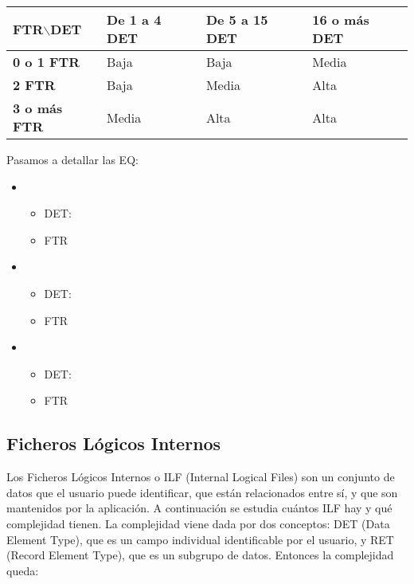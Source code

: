 \documentclass[spanish,a4paper,12pt]{report}	%
\begin{document}
\vspace{0.35cm}

			\begin{tabular}{|p{3cm}||p{3cm}|p{3.2cm}|p{3cm}|}
				\hline
				\textbf{FTR$\backslash$DET} & \textbf{De 1 a 4 DET} & \textbf{De 5 a 15 DET} & \textbf{16  o más DET} \\ \hline \hline
				\textbf{0 o 1 FTR} & Baja & Baja & Media \\ \hline 
				\textbf{2 FTR} & Baja & Media & Alta \\ \hline 
				\textbf{3 o más FTR} & Media & Alta & Alta \\ \hline 
			\end{tabular}

\vspace{0.35cm}

	Pasamos a detallar las EQ:
	\begin{itemize}
		\item{} 
		\begin{itemize}
 			\item{DET:}
			\item{FTR}
		\end{itemize}	
		\item{} 
		\begin{itemize}
 			\item{DET:}
			\item{FTR}
		\end{itemize}
		\item{} 
		\begin{itemize}
 			\item{DET:}
			\item{FTR}
		\end{itemize}

	\end{itemize}




	\subsection{Ficheros Lógicos Internos}
	Los Ficheros Lógicos Internos o ILF (Internal Logical Files) son un conjunto de datos que el usuario puede identificar, que están relacionados entre sí, y que son mantenidos por la aplicación. A continuación se estudia cuántos ILF hay y qué complejidad tienen. La complejidad viene dada por dos conceptos: DET (Data Element Type), que es un campo individual identificable por el usuario, y RET (Record Element Type), que es un subgrupo de datos. Entonces la complejidad queda: 
\end{document}
